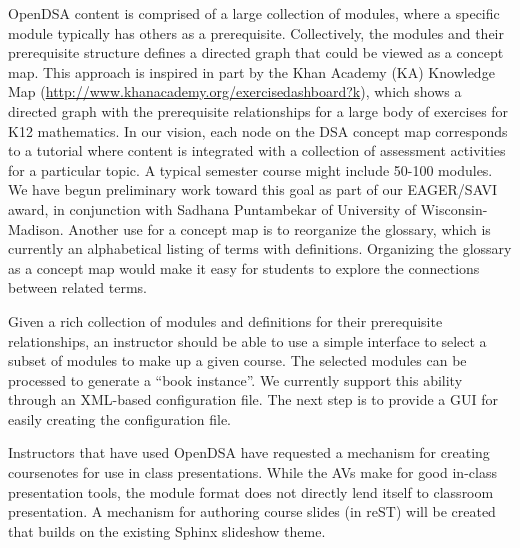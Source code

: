 \documentclass[11pt]{article}
\begin{document}
OpenDSA content is comprised of a large collection of modules, where a
specific module typically has others as a prerequisite.
Collectively, the modules and their prerequisite structure defines a
directed graph that could be viewed as a concept map.
This approach is inspired in part by the Khan Academy (KA) Knowledge
Map (\url{http://www.khanacademy.org/exercisedashboard?k}), which
shows a directed graph with the prerequisite relationships for
a large body of exercises for K12 mathematics.
In our vision, each node on the DSA concept map corresponds to a
tutorial where content is integrated with a collection of assessment
activities for a particular topic.
A typical semester course might include 50-100 modules.
We have begun preliminary work toward this goal as part of our
EAGER/SAVI award, in conjunction with Sadhana Puntambekar of
University of Wisconsin-Madison.
Another use for a concept map is to reorganize the glossary,
which is currently an alphabetical listing of terms with definitions.
Organizing the glossary as a concept map would make it easy for
students to explore the connections between related terms.

Given a rich collection of modules and definitions for their
prerequisite relationships, an instructor should be able to use 
a simple interface to select a subset of modules to make up a given
course.
The selected modules can be processed to generate a ``book instance''.
We currently support this ability through an XML-based configuration
file.
The next step is to provide a GUI for easily creating the
configuration file.

Instructors that have used OpenDSA have requested a mechanism for
creating coursenotes for use in class presentations.
While the AVs make for good in-class presentation tools, the module
format does not directly lend itself to classroom presentation.
A mechanism for authoring course slides (in reST) will be created that
builds on the existing Sphinx slideshow theme.
\end{document}
